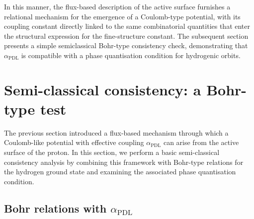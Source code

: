 \documentclass[11pt,a4paper]{article}
\begin{document}
In this manner, the flux-based description of the active surface furnishes a relational mechanism for the emergence of a Coulomb-type potential, with its coupling constant directly linked to the same combinatorial quantities that enter the structural expression for the fine-structure constant. The subsequent section presents a simple semiclassical Bohr-type consistency check, demonstrating that $\alpha_{\mathrm{PDL}}$ is compatible with a phase quantisation condition for hydrogenic orbits.

\section{Semi-classical consistency: a Bohr-type test}
\label{sec:Semiclassical}

The previous section introduced a flux-based mechanism through which a Coulomb-like potential with effective coupling $\alpha_{\mathrm{PDL}}$ can arise from the active surface of the proton. In this section, we perform a basic semi-classical consistency analysis by combining this framework with Bohr-type relations for the hydrogen ground state and examining the associated phase quantisation condition.

\subsection{Bohr relations with \texorpdfstring{$\alpha_{\mathrm{PDL}}$}{alpha	extunderscore{PDL}}}
\end{document}
